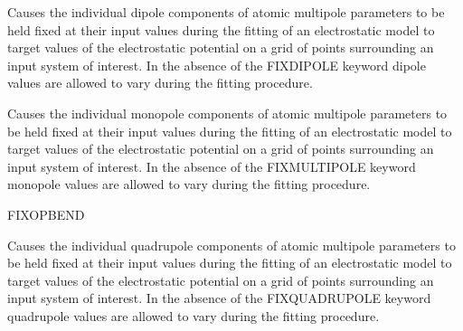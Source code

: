 \documentclass[letterpaper,11pt,english]{sphinxmanual}
\begin{document}
\ignorespaces {}\label{\detokenize{text/keywords:key-fix-dipole}}\begin{description}
\sphinxAtStartPar
Causes the individual dipole components of atomic multipole parameters to be held fixed at their input values during the fitting of an electrostatic model to target values of the electrostatic potential on a grid of points surrounding an input system of interest. In the absence of the FIX\sphinxhyphen{}DIPOLE keyword dipole values are allowed to vary during the fitting procedure.

\end{description}

\ignorespaces {}\label{\detokenize{text/keywords:key-fix-monopole}}\begin{description}
\sphinxAtStartPar
Causes the individual monopole components of atomic multipole parameters to be held fixed at their input values during the fitting of an electrostatic model to target values of the electrostatic potential on a grid of points surrounding an input system of interest. In the absence of the FIX\sphinxhyphen{}MULTIPOLE keyword monopole values are allowed to vary during the fitting procedure.

\end{description}

\ignorespaces {}\label{\detokenize{text/keywords:key-fix-opbend}}
\sphinxAtStartPar
FIX\sphinxhyphen{}OPBEND

\ignorespaces {}\label{\detokenize{text/keywords:key-fix-quadrupole}}\begin{description}
\sphinxAtStartPar
Causes the individual quadrupole components of atomic multipole parameters to be held fixed at their input values during the fitting of an electrostatic model to target values of the electrostatic potential on a grid of points surrounding an input system of interest. In the absence of the FIX\sphinxhyphen{}QUADRUPOLE keyword quadrupole values are allowed to vary during the fitting procedure.

\end{description}
\end{document}
